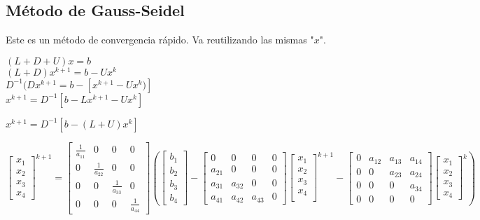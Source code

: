 \subsection{M\'etodo de Gauss-Seidel}
Este es un m\'etodo de convergencia r\'apido. Va reutilizando las mismas "$x$".
\begin{center}
$(L+D+U)x=b$ \\
$(L+D)x^{k+1}=b-Ux^k$ \\
$D^{-1}(Dx^{k+1}=b-[x^{k+1}-Ux^k)]$ \\
$x^{k+1}=D^{-1}[b-Lx^{k+1}-Ux^k]$ 
\end{center}
\begin{center}$x^{k+1}=D^{-1}[b-(L+U)x^k]$\end{center}
\begin{center}$\begin{bmatrix}
x_1 \\ x_2 \\ x_3 \\ x_4 
\end{bmatrix}^{k+1}=\begin{bmatrix}
\frac{1}{a_{11}} & 0 & 0 & 0 \\
0 & \frac{1}{a_{22}} & 0 & 0 \\
0 & 0 & \frac{1}{a_{33}} & 0 \\
0 & 0 & 0 & \frac{1}{a_{44}}
\end{bmatrix}\left(\begin{bmatrix}
b_1 \\ b_2 \\ b_3 \\ b_4
\end{bmatrix}-\begin{bmatrix}
0 & 0 & 0 & 0 \\
a_{21} & 0 & 0 & 0 \\
a_{31} & a_{32} & 0 & 0 \\
a_{41} & a_{42} & a_{43} & 0
\end{bmatrix}\begin{bmatrix}
x_1 \\ x_2 \\ x_3 \\ x_4\\
\end{bmatrix}^{k+1}-\begin{bmatrix}
0 & a_{12} & a_{13} & a_{14} \\
0 & 0 & a_{23} & a_{24} \\
0 & 0 & 0 & a_{34} \\
0 & 0 & 0 & 0
\end{bmatrix} \begin{bmatrix}
x_1 \\ x_2 \\ x_3 \\ x_4
\end{bmatrix}^k \right)$
\end{center}
